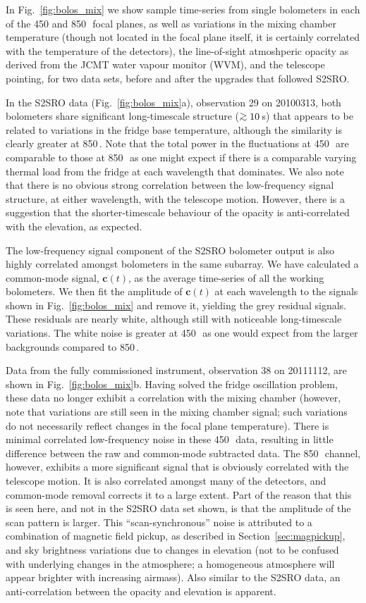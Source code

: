 \documentclass[useAMS,usenatbib,nofootinbib]{mn2e}
\def\gsim{\mathrel{\lower2.5pt\vbox{\lineskip=0pt\baselineskip=0pt
          \hbox{$>$}\hbox{$\sim$}}}}
\begin{document}
In Fig.~\ref{fig:bolos_mix} we show sample time-series from single
bolometers in each of the 450 and 850\,\micron\ focal planes, as well
as variations in the mixing chamber temperature (though not located in
the focal plane itself, it is certainly correlated with the
temperature of the detectors), the line-of-sight atmoshperic opacity
as derived from the JCMT water vapour monitor (WVM), and the telescope
pointing, for two data sets, before and after the upgrades that
followed S2SRO.

In the S2SRO data (Fig.~\ref{fig:bolos_mix}a), observation 29 on
20100313, both bolometers share significant long-timescale structure
($\gsim10$\,s) that appears to be related to variations in the fridge
base temperature, although the similarity is clearly greater at
850\,\micron. Note that the total power in the fluctuations at
450\,\micron\ are comparable to those at 850\,\micron\ as one might
expect if there is a comparable varying thermal load from the fridge
at each wavelength that dominates. We also note that there is no
obvious strong correlation between the low-frequency signal structure,
at either wavelength, with the telescope motion. However, there is a
suggestion that the shorter-timescale behaviour of the opacity is
anti-correlated with the elevation, as expected.

The low-frequency signal component of the S2SRO bolometer output is
also highly correlated amongst bolometers in the same subarray. We
have calculated a common-mode signal, $\mathbf{c}(t)$, as the average
time-series of all the working bolometers. We then fit the amplitude
of $\mathbf{c}(t)$ at each wavelength to the signals shown in
Fig.~\ref{fig:bolos_mix} and remove it, yielding the grey residual
signals. These residuals are nearly white, although still with
noticeable long-timescale variations. The white noise is greater at
450\,\micron\ as one would expect from the larger backgrounds compared
to 850\,\micron.

Data from the fully commissioned instrument, observation 38 on
20111112, are shown in Fig.~\ref{fig:bolos_mix}b. Having solved the
fridge oscillation problem, these data no longer exhibit a correlation
with the mixing chamber (however, note that variations are still seen
in the mixing chamber signal; such variations do not necessarily
reflect changes in the focal plane temperature). There is minimal
correlated low-frequency noise in these 450\,\micron\ data, resulting
in little difference between the raw and common-mode subtracted
data. The 850\,\micron\ channel, however, exhibits a more significant
signal that is obviously correlated with the telescope motion. It is
also correlated amongst many of the detectors, and common-mode removal
corrects it to a large extent. Part of the reason that this is seen
here, and not in the S2SRO data set shown, is that the amplitude of
the scan pattern is larger. This ``scan-synchronous'' noise is
attributed to a combination of magnetic field pickup, as described in
Section~\ref{sec:magpickup}, and sky brightness variations due to
changes in elevation (not to be confused with underlying changes in
the atmosphere; a homogeneous atmosphere will appear brighter with
increasing airmass). Also similar to the S2SRO data, an
anti-correlation between the opacity and elevation is apparent.
\end{document}
